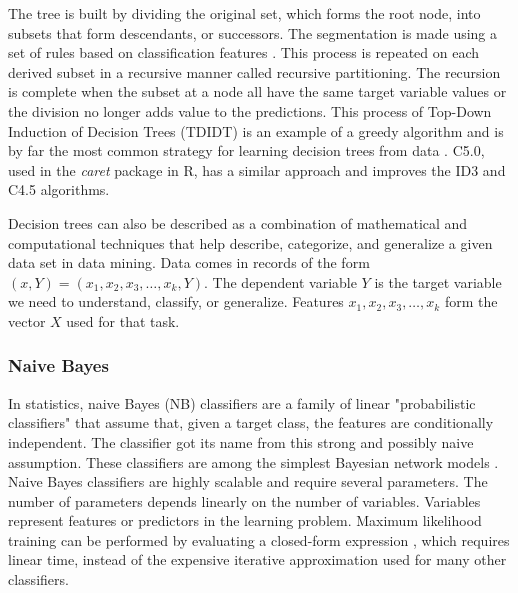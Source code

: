 \documentclass[preprint,12pt]{elsarticle}
\begin{document}
The tree is built by dividing the original set, which forms the root node, into subsets that form descendants, or successors. The segmentation is made using a set of rules based on classification features \cite{ShalevShwartz2014}. This process is repeated on each derived subset in a recursive manner called recursive partitioning. The recursion is complete when the subset at a node all have the same target variable values or the division no longer adds value to the predictions. This process of Top-Down Induction of Decision Trees (TDIDT) \cite{Quinlan1986} is an example of a greedy algorithm and is by far the most common strategy for learning decision trees from data \cite{Rokach2005}. C5.0, used in the \textit{caret} package in R, has a similar approach and improves the ID3 and C4.5 algorithms.

Decision trees can also be described as a combination of mathematical and computational techniques that help describe, categorize, and generalize a given data set in data mining. Data comes in records of the form $(x, Y) = (x_{1}, x_{2}, x_{3}, \ldots, x_{k}, Y)$. The dependent variable $Y$ is the target variable we need to understand, classify, or generalize. Features $x_{1}, x_{2}, x_{3}, \ldots, x_{k}$ form the vector $X$ used for that task.

\subsubsection{Naive Bayes}

In statistics, naive Bayes (NB) classifiers are a family of linear "probabilistic classifiers" that assume that, given a target class, the features are conditionally independent. The classifier got its name from this strong and possibly naive assumption. These classifiers are among the simplest Bayesian network models \cite{McCallum2011}. Naive Bayes classifiers are highly scalable and require several parameters. The number of parameters depends linearly on the number of variables. Variables represent features or predictors in the learning problem. Maximum likelihood training can be performed by evaluating a closed-form expression \cite{Russell1999}, which requires linear time, instead of the expensive iterative approximation used for many other classifiers.
\end{document}
